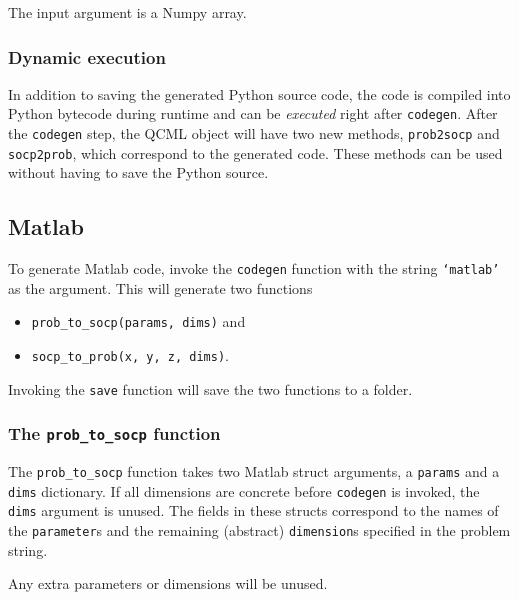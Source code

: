\documentclass[11pt]{article}
\begin{document}
The input argument is a Numpy array.

\subsubsection{Dynamic execution}
In addition to saving the generated Python source code, the code is compiled
into Python bytecode during runtime and can be \emph{executed} right after
{\tt codegen}. After the {\tt codegen} step, the QCML object will have two
new methods, {\tt prob2socp} and {\tt socp2prob}, which correspond to the
generated code. These methods can be used without having to save the Python
source.

\subsection{Matlab}
To generate Matlab code, invoke the {\tt codegen} function with the string
{\tt `matlab'} as the argument. This will generate two functions
\begin{itemize}
\item {\tt prob\_to\_socp(params, dims)} and
\item {\tt socp\_to\_prob(x, y, z, dims)}.
\end{itemize}
Invoking the {\tt save} function will save the two functions to a folder.

\subsubsection{The {\tt prob\_to\_socp} function}
The {\tt prob\_to\_socp} function takes two Matlab struct
arguments, a {\tt params} and a {\tt dims} dictionary. If all dimensions are
concrete before {\tt codegen} is invoked, the {\tt dims} argument is unused.
The fields in these
structs correspond to the names of the {\tt parameter}s and the
remaining (abstract)
{\tt dimension}s specified in the problem string.

Any extra parameters or dimensions will be unused.
\end{document}

